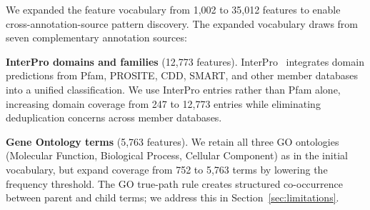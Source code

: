 \begin{table}[t]
\caption{Feature vocabulary composition.
The expanded vocabulary comprises 35,012 features across seven annotation
sources, a $35\times$ increase over the initial 1,002-feature set (shown in
parentheses for comparison). Features retained at min\_count${\geq}$3,423.}
\label{tab:features-35k}
\centering
{}
\end{table}



We expanded the feature vocabulary from 1,002 to 35,012 features to enable
cross-annotation-source pattern discovery. The expanded vocabulary draws from
seven complementary annotation sources:

\textbf{InterPro domains and families} (12,773 features).
InterPro~\cite{mistry2021} integrates domain predictions from Pfam, PROSITE,
CDD, SMART, and other member databases into a unified classification. We use
InterPro entries rather than Pfam alone, increasing domain coverage from 247 to
12,773 entries while eliminating deduplication concerns across member databases.

\textbf{Gene Ontology terms} (5,763 features).
We retain all three GO ontologies (Molecular Function, Biological Process,
Cellular Component) as in the initial vocabulary, but expand coverage from 752
to 5,763 terms by lowering the frequency threshold. The GO true-path rule
creates structured co-occurrence between parent and child terms; we address
this in Section~\ref{sec:limitations}.


